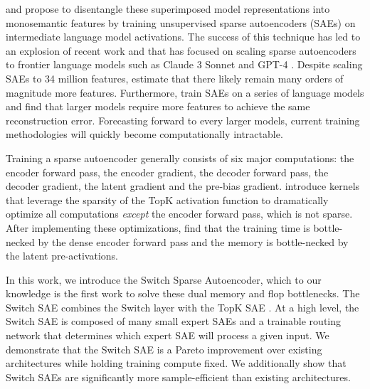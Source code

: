 \documentclass{article} %
\begin{document}
\cite{dictionary_monosemanticity_anthropic} and \cite{other_sae_paper} propose to disentangle these superimposed model representations into monosemantic features by training unsupervised sparse autoencoders (SAEs) on intermediate language model activations. The success of this technique has led to an explosion of recent work \citep{templeton2024scaling} and \cite{gao2024scalingevaluatingsparseautoencoders} that has focused on scaling sparse autoencoders to frontier language models such as Claude 3 Sonnet \citep{claude3modelcard} and GPT-4 \citep{gpt_4_tech_report}. Despite scaling SAEs to 34 million features, \cite{templeton2024scaling} estimate that there likely remain many orders of magnitude more features. Furthermore, \cite{gao2024scalingevaluatingsparseautoencoders} train SAEs on a series of language models and find that larger models require more features to achieve the same reconstruction error. Forecasting forward to every larger models, current training methodologies will quickly become computationally intractable.

Training a sparse autoencoder generally consists of six major computations: the encoder forward pass, the encoder gradient, the decoder forward pass, the decoder gradient, the latent gradient and the pre-bias gradient. \cite{gao2024scalingevaluatingsparseautoencoders} introduce kernels that leverage the sparsity of the TopK activation function to dramatically optimize all computations \textit{except} the encoder forward pass, which is not sparse. After implementing these optimizations, \cite{gao2024scalingevaluatingsparseautoencoders} find that the training time is bottle-necked by the dense encoder forward pass and the memory is bottle-necked by the latent pre-activations. 


In this work, we introduce the Switch Sparse Autoencoder, which to our knowledge is the first work to solve these dual memory and flop bottlenecks. The Switch SAE combines the Switch layer \citep{fedus2022switch} with the TopK SAE \citep{gao2024scalingevaluatingsparseautoencoders}. At a high level, the Switch SAE is composed of many small expert SAEs and a trainable routing network that determines which expert SAE will process a given input. We demonstrate that the Switch SAE is a Pareto improvement over existing architectures while holding training compute fixed. We additionally show that Switch SAEs are significantly more sample-efficient than existing architectures.
\end{document}
